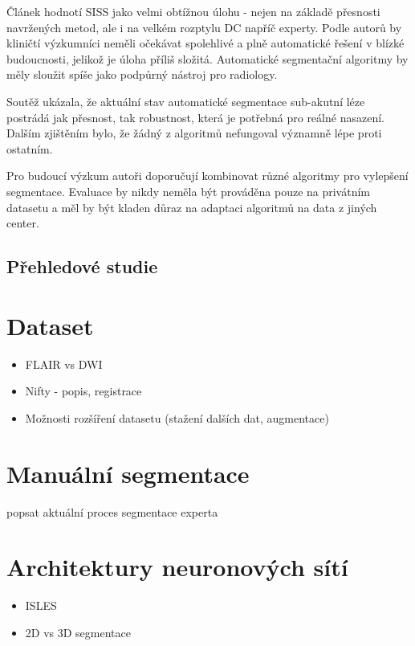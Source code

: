 \documentclass[11pt]{article}
\begin{document}
Článek hodnotí SISS jako velmi obtížnou úlohu - nejen na základě přesnosti navržených metod, ale i na velkém rozptylu DC napříč experty. Podle autorů by kliničtí výzkumníci neměli očekávat spolehlivé a plně automatické řešení v blízké budoucnosti, jelikož je úloha příliš složitá. Automatické segmentační algoritmy by měly sloužit spíše jako podpůrný nástroj pro radiology.

Soutěž ukázala, že aktuální stav automatické segmentace sub-akutní léze postrádá jak přesnost, tak robustnost, která je potřebná pro reálné nasazení. Dalším zjištěním bylo, že žádný z algoritmů nefungoval významně lépe proti ostatním. 

Pro budoucí výzkum autoři doporučují kombinovat různé algoritmy pro vylepšení segmentace. Evaluace by nikdy neměla být prováděna pouze na privátním datasetu a měl by být kladen důraz na adaptaci algoritmů na data z jiných center.

\subsection{Přehledové studie}

\section{Dataset}
\begin{itemize}
	\item FLAIR vs DWI
	\item Nifty - popis, registrace
	\item Možnosti rozšíření datasetu (stažení dalších dat, augmentace)
\end{itemize}

\section{Manuální segmentace}
popsat aktuální proces segmentace experta

\section{Architektury neuronových sítí}
\begin{itemize}
	\item ISLES
	\item 2D vs 3D segmentace
\end{itemize}

\printbibliography
\end{document}
